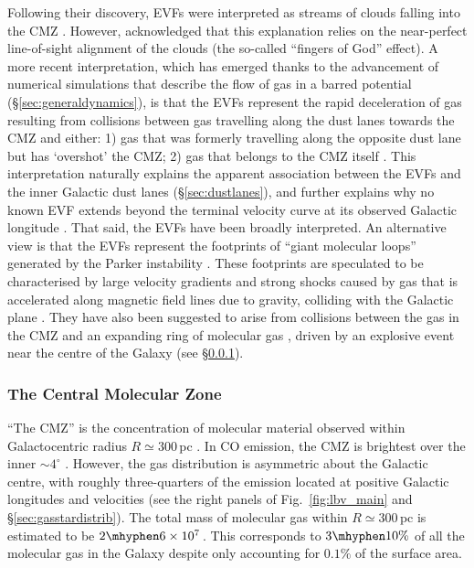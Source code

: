 Following their discovery, EVFs were interpreted as streams of clouds falling into the CMZ \citep{Stark1986, Boyce1989, Baba2010}. However, \citet{Stark1986} acknowledged that this explanation relies on the near-perfect line-of-sight alignment of the clouds (the so-called ``fingers of God'' effect). A more recent interpretation, which has emerged thanks to the advancement of numerical simulations that describe the flow of gas in a barred potential (\S\ref{sec:generaldynamics}), is that the EVFs represent the rapid deceleration of gas resulting from collisions between gas travelling along the dust lanes towards the CMZ and either: 1) gas that was formerly travelling along the opposite dust lane but has `overshot' the CMZ; 2) gas that belongs to the CMZ itself \citep{Fux1999, Liszt2006, Liszt2008, Rodriguez-Fernandez2008, Bally2010, Sormani2019a, Akhter2021}. This interpretation naturally explains the apparent association between the EVFs and the inner Galactic dust lanes (\S\ref{sec:dustlanes}), and further explains why no known EVF extends beyond the terminal velocity curve at its observed Galactic longitude \citep{Sormani2019a}. That said, the EVFs have been broadly interpreted.  An alternative view is that the EVFs represent the footprints of ``giant molecular loops'' generated by the Parker instability \citep{Parker1966}. These footprints are speculated to be characterised by large velocity gradients and strong shocks caused by gas that is accelerated along magnetic field lines due to gravity, colliding with the Galactic plane \citep{Fukui2006, Fujishita2009, Machida2009, Torii2010, Riquelme2018, Enokiya2021}. They have also been suggested to arise from collisions between the gas in the CMZ and an expanding ring of molecular gas \citep{Uchida1994,Oka2020}, driven by an explosive event near the centre of the Galaxy (see \S\ref{sec:cmz}). 

\subsubsection{The Central Molecular Zone}\label{sec:cmz}

``The CMZ'' is the concentration of molecular material observed within Galactocentric radius $R\simeq300$\,pc \citep[][]{Morris1996}. In CO emission, the CMZ is brightest over the inner $\sim4^{\circ}$ \citep{Bally1988, Oka1998b, Eden2020}. However, the gas distribution is asymmetric about the Galactic centre, with roughly three-quarters of the emission located at positive Galactic longitudes and velocities (see the right panels of Fig.~\ref{fig:lbv_main} and \S\ref{sec:gasstardistrib}). The total mass of molecular gas within $R\simeq300$\,pc is estimated to be $2\mhyphen6\times10^{7}$\,\msun \citep{Dahmen1998, Ferriere2007}. This corresponds to $3\mhyphen10\%$ of all the molecular gas in the Galaxy \citep[$6.5\times10^{8}$\,\msun; ][]{Roman-Duval2016} despite only accounting for $0.1\%$ of the surface area. 

